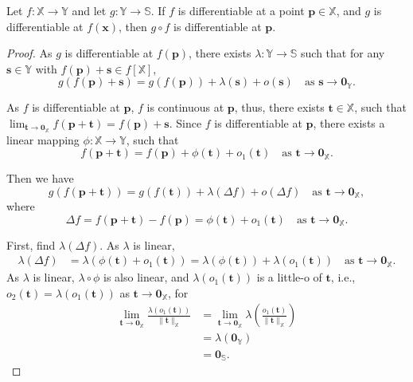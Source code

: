 \begin{lemma}
	\label{lm: differentiable: composed}
	
	Let $f: \mathbb X \to \mathbb Y$ and let $g: \mathbb Y \to \mathbb S$. If $f$ is differentiable at a point $\mathbf p \in \mathbb X$, and $g$ is differentiable at $f(\mathbf x)$, then $g \circ f$ is differentiable at $\mathbf p$.
	
	\begin{proof}
		As $g$ is differentiable at $f(\mathbf p)$, there exists $\lambda: \mathbb Y \to \mathbb S$ such that for any $\mathbf s \in \mathbb Y$ with $f(\mathbf p) + \mathbf s \in f[\mathbb X]$,
		$$
		g(f(\mathbf p) + \mathbf s) = g(f(\mathbf p)) + \lambda(\mathbf s) + o(\mathbf s) \quad \text{as $\mathbf s \to \mathbf 0_{\mathbb Y}$}.
		$$
		
		As $f$ is differentiable at $\mathbf p$, $f$ is continuous at $\mathbf p$, thus, there exists $\mathbf t \in \mathbb X$, such that $\displaystyle\lim_{\mathbf t \to \mathbf 0_{\mathbb X}} f(\mathbf p + \mathbf t) = f(\mathbf p) + \mathbf s$. Since $f$ is differentiable at $\mathbf p$, there exists a linear mapping $\phi: \mathbb X \to \mathbb Y$, such that
		$$
		f(\mathbf p + \mathbf t) = f(\mathbf p) + \phi(\mathbf t) + o_1 (\mathbf t) \quad \text{as $\mathbf t \to \mathbf 0_{\mathbb X}$}.
		$$
		
		Then we have
		$$
		g(f(\mathbf p + \mathbf t)) = g(f(\mathbf t)) + \lambda(\Delta f) + o(\Delta f) \quad \text{as $\mathbf t \to \mathbf 0_{\mathbb X}$},
		$$
		where
		$$
		\Delta f = f(\mathbf p + \mathbf t) - f(\mathbf p) = \phi(\mathbf t) + o_1(\mathbf t) \quad \text{as $\mathbf t \to \mathbf 0_{\mathbb X}$}.
		$$
		
		First, find $\lambda(\Delta f)$. As $\lambda$ is linear,
		$$
		\begin{aligned}
			\lambda(\Delta f) &= \lambda(\phi(\mathbf t) + o_1(\mathbf t))
			= \lambda(\phi(\mathbf t)) + \lambda(o_1 (\mathbf t)) \quad \text{as $\mathbf t \to \mathbf 0_{\mathbb X}$}.
		\end{aligned}
		$$
		As $\lambda$ is linear, $\lambda \circ \phi$ is also linear, and $\lambda(o_1(\mathbf t))$ is a little-o of $\mathbf t$, i.e., $o_2(\mathbf t) = \lambda(o_1(\mathbf t))$ as $\mathbf t \to \mathbf 0_{\mathbb X}$, for
		$$
		\begin{aligned}
			\lim_{\mathbf t \to \mathbf 0_{\mathbb X}} \frac{\lambda(o_1(\mathbf t))}{\| \mathbf t \|_{\mathbb X}} &= \lim_{\mathbf t \to \mathbf 0_{\mathbb X}} \lambda\left( \frac{ o_1 (\mathbf t) }{ \| \mathbf t \|_{\mathbb X} } \right) \\
			&= \lambda(\mathbf 0_{\mathbb Y}) \\
			&= \mathbf 0_{\mathbb S}.
		\end{aligned}
		$$
		

\end{proof}
\end{lemma}
